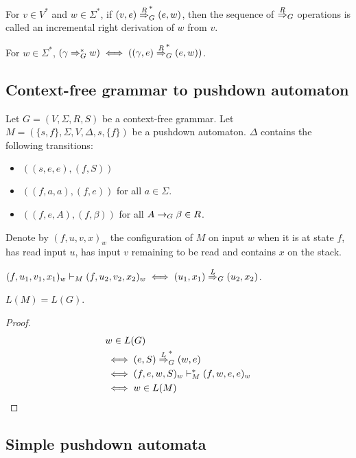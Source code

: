 For $v \in V^*$ and $w \in \Sigma^*$, if $(v, e) \overset{R}{\Rightarrow}_{G}^* (e, w)$,
then the sequence of $\overset{R}{\Rightarrow}_{G}$ operations
is called an incremental right derivation of $w$ from $v$.

\begin{theorem}
For $w \in \Sigma^*$,
$(\gamma \Rightarrow_{G}^* w) \iff ((\gamma, e) \overset{R}{\Rightarrow}_{G}^* (e, w))$.
\end{theorem}

\subsection{Context-free grammar to pushdown automaton}

Let $G = (V, \Sigma, R, S)$ be a context-free grammar.
Let $M = (\{s, f\}, \Sigma, V, \Delta, s, \{f\})$ be a pushdown automaton.
$\Delta$ contains the following transitions:
\begin{itemize}
\item $((s, e, e), (f, S))$
\item $((f, a, a), (f, e))$ for all $a \in \Sigma$.
\item $((f, e, A), (f, \beta))$ for all $A \rightarrow_{G} \beta \in R$.
\end{itemize}

Denote by $(f, u, v, x)_w$ the configuration of $M$ on input $w$ when it is at state $f$,
has read input $u$, has input $v$ remaining to be read and contains $x$ on the stack.

\begin{theorem}
$(f, u_1, v_1, x_1)_w \vdash_M (f, u_2, v_2, x_2)_w \iff (u_1, x_1) \overset{L}{\Rightarrow}_{G} (u_2, x_2)$.
\end{theorem}
\begin{theorem}$L(M) = L(G)$.\end{theorem}
\begin{proof}
\begin{align*}
& w \in L(G)
\\ &\iff (e, S) \overset{L}{\Rightarrow}_{G}^* (w, e)
\\ &\iff (f, e, w, S)_w \vdash_M^* (f, w, e, e)_w
\\ &\iff w \in L(M)
\end{align*}
\end{proof}

\subsection{Simple pushdown automata}

